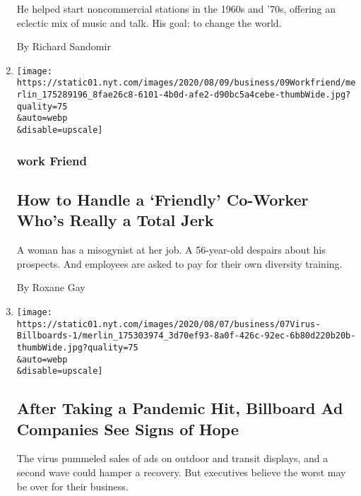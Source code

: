 \begin{enumerate}
  He helped start noncommercial stations in the 1960s and '70s, offering
  an eclectic mix of music and talk. His goal: to change the world.

  By Richard Sandomir
\item
  \href{/2020/08/07/business/how-to-handle-a-friendly-co-worker-whos-really-a-total-jerk.html}{}

  \texttt{[image: https://static01.nyt.com/images/2020/08/09/business/09Workfriend/merlin\_175289196\_8fae26c8-6101-4b0d-afe2-d90bc5a4cebe-thumbWide.jpg?quality=75\\\&auto=webp\\\&disable=upscale]}

  \hypertarget{work-friend}{%
  \subsubsection{work Friend}\label{work-friend}}

  \hypertarget{how-to-handle-a-friendly-co-worker-whos-really-a-total-jerk}{%
  \subsection{How to Handle a `Friendly' Co-Worker Who's Really a Total
  Jerk}\label{how-to-handle-a-friendly-co-worker-whos-really-a-total-jerk}}

  A woman has a misogynist at her job. A 56-year-old despairs about his
  prospects. And employees are asked to pay for their own diversity
  training.

  By Roxane Gay
\item
  \href{/2020/08/07/business/media/billboard-advertising-pandemic.html}{}

  \texttt{[image: https://static01.nyt.com/images/2020/08/07/business/07Virus-Billboards-1/merlin\_175303974\_3d70ef93-8a0f-426c-92ec-6b80d220b20b-thumbWide.jpg?quality=75\\\&auto=webp\\\&disable=upscale]}

  \hypertarget{after-taking-a-pandemic-hit-billboard-ad-companies-see-signs-of-hope}{%
  \subsection{After Taking a Pandemic Hit, Billboard Ad Companies See
  Signs of
  Hope}\label{after-taking-a-pandemic-hit-billboard-ad-companies-see-signs-of-hope}}

  The virus pummeled sales of ads on outdoor and transit displays, and a
  second wave could hamper a recovery. But executives believe the worst
  may be over for their business.


\end{enumerate}
